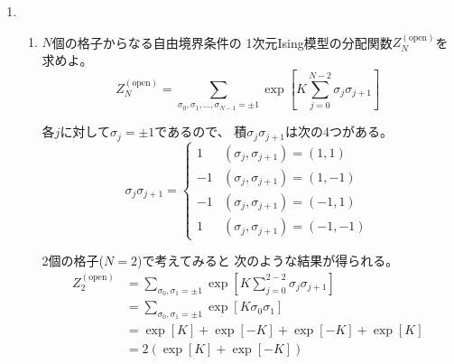\documentclass[12pt,b5paper]{ltjsarticle}
\begin{document}
\hrulefill

\begin{enumerate}
 \item
      \begin{enumerate}
       \item
            $N$個の格子からなる自由境界条件の
            1次元Ising模型の分配関数$Z^{(\mathrm{open})}_{N}$を求めよ。
            \begin{equation}
             Z^{(\mathrm{open})}_{N}
              = \sum_{\sigma_{0},\sigma_{1},\dots,\sigma_{N-1} = \pm 1}
              \exp \left[
                    K \sum_{j=0}^{N-2}\sigma_{j}\sigma_{j+1}
                    \right]
            \end{equation}

            \dotfill

            各$j$に対して$\sigma_{j}=\pm 1$であるので、
            積$\sigma_{j}\sigma_{j+1}$は次の4つがある。
            \begin{equation}
             \sigma_{j}\sigma_{j+1} =
             \begin{cases}
              1 & (\sigma_{j},\sigma_{j+1})=(1,1)\\
              -1 & (\sigma_{j},\sigma_{j+1})=(1,-1)\\
              -1 & (\sigma_{j},\sigma_{j+1})=(-1,1)\\
              1 & (\sigma_{j},\sigma_{j+1})=(-1,-1)
             \end{cases}
            \end{equation}

            2個の格子($N=2$)で考えてみると
            次のような結果が得られる。
            \begin{align}
             Z^{(\mathrm{open})}_{2}
              &= \sum_{\sigma_{0},\sigma_{1} = \pm 1}
              \exp \left[
                    K \sum_{j=0}^{2-2}\sigma_{j}\sigma_{j+1}
                    \right]\\
              &= \sum_{\sigma_{0},\sigma_{1} = \pm 1}
              \exp \left[
                    K \sigma_{0}\sigma_{1}
                    \right]\\
             &= \exp\left[ K \right] + \exp\left[ -K \right]
             + \exp\left[ -K \right] + \exp\left[ K \right]\\
             &= 2\left( \exp\left[ K \right] + \exp\left[ -K \right] \right)\label{eq_r2}
            \end{align}



\end{enumerate}
\end{enumerate}
\end{document}
